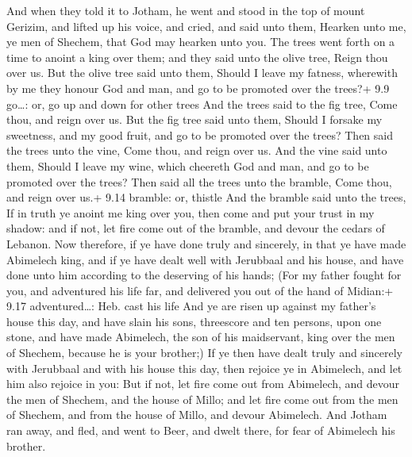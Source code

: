  And when they told it to Jotham, he went and stood in the
top of mount Gerizim, and lifted up his voice, and cried, and said unto
them, Hearken unto me, ye men of Shechem, that God may hearken unto you.
 The trees went forth on a time to anoint a king over them;
and they said unto the olive tree, Reign thou over us.  But
the olive tree said unto them, Should I leave my fatness, wherewith by
me they honour God and man, and go to be promoted over the trees?+ 9.9
go\ldots: or, go up and down for other trees  And the trees
said to the fig tree, Come thou, and reign over us.  But
the fig tree said unto them, Should I forsake my sweetness, and my good
fruit, and go to be promoted over the trees?  Then said the
trees unto the vine, Come thou, and reign over us.  And the
vine said unto them, Should I leave my wine, which cheereth God and man,
and go to be promoted over the trees?  Then said all the
trees unto the bramble, Come thou, and reign over us.+ 9.14 bramble: or,
thistle  And the bramble said unto the trees, If in truth
ye anoint me king over you, then come and put your trust in my shadow:
and if not, let fire come out of the bramble, and devour the cedars of
Lebanon.  Now therefore, if ye have done truly and
sincerely, in that ye have made Abimelech king, and if ye have dealt
well with Jerubbaal and his house, and have done unto him according to
the deserving of his hands;  (For my father fought for you,
and adventured his life far, and delivered you out of the hand of
Midian:+ 9.17 adventured\ldots: Heb. cast his life  And ye
are risen up against my father's house this day, and have slain his
sons, threescore and ten persons, upon one stone, and have made
Abimelech, the son of his maidservant, king over the men of Shechem,
because he is your brother;)  If ye then have dealt truly
and sincerely with Jerubbaal and with his house this day, then rejoice
ye in Abimelech, and let him also rejoice in you:  But if
not, let fire come out from Abimelech, and devour the men of Shechem,
and the house of Millo; and let fire come out from the men of Shechem,
and from the house of Millo, and devour Abimelech.  And
Jotham ran away, and fled, and went to Beer, and dwelt there, for fear
of Abimelech his brother.

